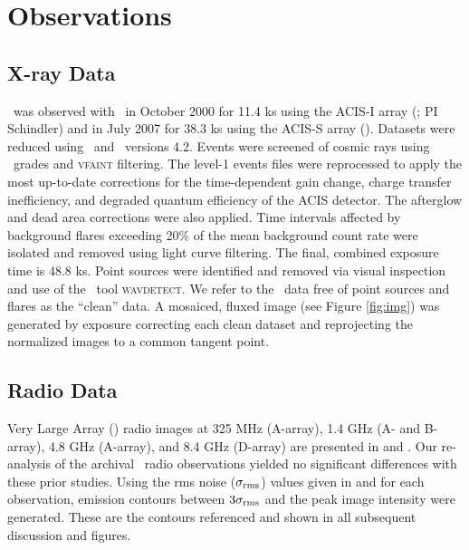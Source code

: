 \documentclass[11pt, preprint]{aastex}
\begin{document}
\section{Observations}
\label{sec:obs}

\subsection{X-ray Data}
\label{sec:xray}

\rbs\ was observed with \cxo\ in October 2000 for 11.4 ks using the
ACIS-I array (; PI
Schindler) and in July 2007 for 38.3 ks using the ACIS-S array
(). Datasets were reduced
using \ciao\ and \caldb\ versions 4.2. Events were screened of cosmic
rays using \asca\ grades and {\textsc{vfaint}} filtering. The level-1
events files were reprocessed to apply the most up-to-date corrections
for the time-dependent gain change, charge transfer inefficiency, and
degraded quantum efficiency of the ACIS detector. The afterglow and
dead area corrections were also applied. Time intervals affected by
background flares exceeding 20\% of the mean background count rate
were isolated and removed using light curve filtering. The final,
combined exposure time is 48.8 ks. Point sources were identified and
removed via visual inspection and use of the \ciao\ tool
{\textsc{wavdetect}}. We refer to the \cxo\ data free of point sources
and flares as the ``clean'' data. A mosaiced, fluxed image (see Figure
\ref{fig:img}) was generated by exposure correcting each clean dataset
and reprojecting the normalized images to a common tangent point.

\subsection{Radio Data}
\label{sec:radio}

Very Large Array (\vla) radio images at 325 MHz (A-array), 1.4 GHz (A-
and B-array), 4.8 GHz (A-array), and 8.4 GHz (D-array) are presented
in \citet{gitti06} and \citet{birzan08}. Our re-analysis of the
archival \vla\ radio observations yielded no significant differences
with these prior studies. Using the rms noise ($\sigma_{\rm{rms}}$)
values given in \citet{gitti06} and \citet{birzan08} for each
observation, emission contours between $3\sigma_{\rm{rms}}$ and the
peak image intensity were generated. These are the contours referenced
and shown in all subsequent discussion and figures.
\end{document}
